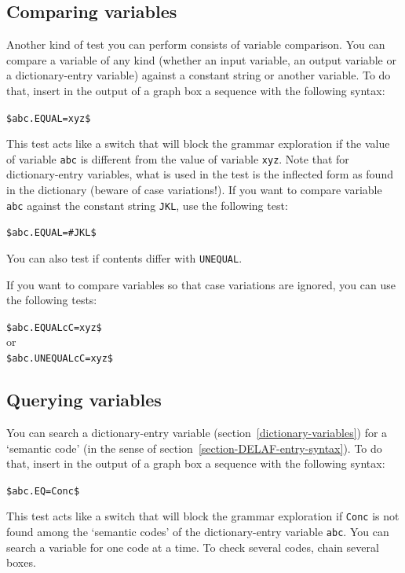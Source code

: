 \subsection{Comparing variables}
Another kind of test you can perform consists of variable comparison.
You can compare a variable of any kind (whether an input variable, an output variable or a dictionary-entry variable)
against a constant string or another variable. To do that, insert in the output of a graph box a sequence with the following syntax:

\bigskip
\noindent \verb+$abc.EQUAL=xyz$+

\bigskip
\noindent This test acts like a switch that will block the grammar exploration if the value of variable \verb+abc+
is different from the value of variable \verb+xyz+. Note that for dictionary-entry variables,
what is used in the test is the inflected form
as found in the dictionary (beware of case variations!). If you want to compare variable
\verb+abc+ against the constant string \verb+JKL+, use the following test:

\bigskip
\noindent \verb+$abc.EQUAL=#JKL$+

\bigskip
\noindent You can also test if contents differ with \verb+UNEQUAL+.

\bigskip
\noindent If you want to compare variables so that case variations are ignored, you can use the following tests:

\bigskip
\noindent \verb+$abc.EQUALcC=xyz$+ \\
or \\
\verb+$abc.UNEQUALcC=xyz$+

\subsection{Querying variables}
You can search a dictionary-entry variable 
(section~\ref{dictionary-variables}) for a `semantic code' (in the sense of section~\ref{section-DELAF-entry-syntax}). To do that, insert in the output of a graph box a sequence with the following syntax:

\bigskip
\noindent \verb+$abc.EQ=Conc$+

\bigskip
\noindent This test acts like a switch that will block the grammar exploration if \verb+Conc+ is not found among the `semantic codes' of the dictionary-entry variable \verb+abc+. You can search a variable for one code at a time. To check several codes, chain several boxes.

